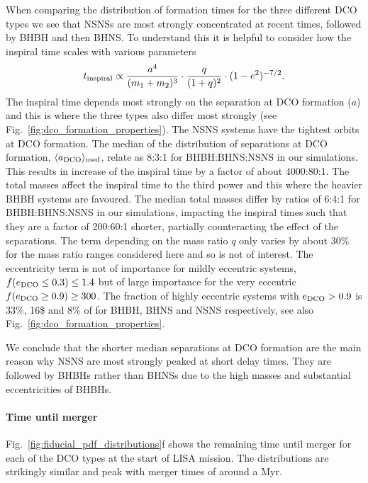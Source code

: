 When comparing the distribution of formation times for the three different DCO types we see that NSNSs are most strongly concentrated at recent times, followed by BHBH and then BHNS. To understand this it is helpful to consider how the inspiral time scales with various parameters
\begin{equation}
    t_{\rm inspiral} \propto \frac{a^4}{(m_1 + m_2)^{3}} \cdot \frac{q}{(1+q)^2} \cdot (1 - e^2)^{-7/2}.
\end{equation}
The inspiral time depends most strongly on the separation at DCO formation ($a$) and this is where the three types also differ most strongly (see Fig.~\ref{fig:dco_formation_properties}). The NSNS systems have the tightest orbits at DCO formation. The median of the distribution of separations at DCO formation, $\langle a_{\rm DCO} \rangle_{\rm med}$, relate as 8:3:1 for BHBH:BHNS:NSNS in our simulations. This results in increase of the inspiral time by a factor of about 4000:80:1. The total masses affect the inspiral time to the third power and this where the heavier BHBH systems are favoured. The median total masses differ by ratios of 6:4:1 for BHBH:BHNS:NSNS in our simulations, impacting the inspiral times such that they are a factor of 200:60:1 shorter, partially counteracting the effect of the separations. The term depending on the mass ratio $q$ only varies by about 30\% for the mass ratio ranges considered here and so is not of interest. The eccentricity term is not of importance for mildly eccentric systems, $f(e_{\rm DCO} \le 0.3)  \le 1.4$ but of large importance for the very eccentric  $f(e_{\rm DCO} \ge 0.9) \ge 300$. The fraction of highly eccentric systems with $e_{\rm DCO}>0.9$ is 33\%, 16\$ and 8\% of for BHBH, BHNS and NSNS respectively, see also Fig.~\ref{fig:dco_formation_properties}. 

We conclude that the shorter median separations at DCO formation are the main reason why NSNS are most strongly peaked at short delay times. They are followed by BHBHs rather than BHNSs due to the high masses and substantial eccentricities of BHBHs.

\paragraph{Time until merger} Fig.~\ref{fig:fiducial_pdf_distributions}f shows the remaining time until merger for each of the DCO types at the start of LISA mission. The distributions are strikingly similar and peak with merger times of around a Myr.

